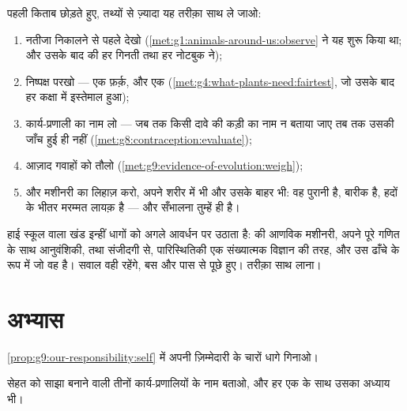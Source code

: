 \begin{method}[स्नातक का तरीक़ा]\label{met:g9:our-responsibility:method}
पहली किताब छोड़ते हुए, तथ्यों से ज़्यादा यह तरीक़ा साथ ले जाओ:
\begin{enumerate}
  \item नतीजा निकालने से पहले देखो
        (\cref{met:g1:animals-around-us:observe} ने यह शुरू किया था;
        और उसके बाद की हर गिनती तथा हर नोटबुक ने);
  \item निष्पक्ष परखो --- एक फ़र्क़, और एक 
        (\cref{met:g4:what-plants-need:fairtest}, जो उसके बाद हर
        कक्षा में इस्तेमाल हुआ);
  \item कार्य-प्रणाली का नाम लो --- जब तक किसी दावे की कड़ी का नाम न
        बताया जाए तब तक उसकी जाँच हुई ही नहीं
        (\cref{met:g8:contraception:evaluate});
  \item आज़ाद गवाहों को तौलो
        (\cref{met:g9:evidence-of-evolution:weigh});
  \item और  मशीनरी का लिहाज़ करो, अपने शरीर में भी और उसके बाहर भी:
        वह पुरानी है, बारीक है, हदों के भीतर मरम्मत लायक़ है --- और
        सँभालना तुम्हें ही है।
\end{enumerate}
\end{method}

\begin{remark}[आगे क्या आता है]\label{rem:g9:our-responsibility:next}
हाई स्कूल वाला खंड इन्हीं धागों को अगले आवर्धन पर उठाता है:  की
आणविक मशीनरी, अपने पूरे गणित के साथ आनुवंशिकी,  तथा  संजीदगी से, पारिस्थितिकी एक संख्यात्मक विज्ञान की तरह, और 
उस ढाँचे के रूप में जो वह है। सवाल वही रहेंगे, बस और पास से पूछे हुए।
तरीक़ा साथ लाना।
\end{remark}

\section{अभ्यास}

\begin{exercise}[$\star$]\label{exo:g9:our-responsibility:1}
\cref{prop:g9:our-responsibility:self} में अपनी ज़िम्मेदारी के चारों
धागे गिनाओ।
\end{exercise}

\begin{exercise}[$\star$]\label{exo:g9:our-responsibility:2}
सेहत को साझा बनाने वाली तीनों कार्य-प्रणालियों के नाम बताओ, और हर एक के
साथ उसका अध्याय भी।
\end{exercise}

